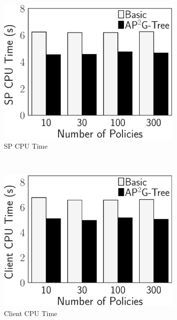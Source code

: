 \begin{figure}[t]
    \centering
    \begin{subfigure}{.33\linewidth}
        \includegraphics[height=\ht\figbox]{exp-figs/access-control/policy_1_sp.eps}
        \caption{SP CPU Time}
    \end{subfigure}~%
    \begin{subfigure}{.33\linewidth}
        \includegraphics[height=\ht\figbox]{exp-figs/access-control/policy_1_user.eps}
        \caption{Client CPU Time}
    \end{subfigure}~%
    \begin{subfigure}{.33\linewidth}

\end{subfigure}
\end{figure}
